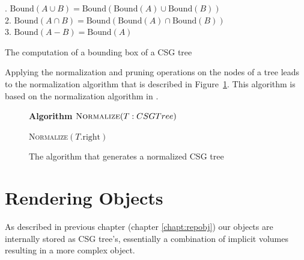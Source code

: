 \documentclass[a4paper,10pt,twocolumn]{article}
\newcommand{\Bound}{\mbox{Bound}}
\begin{document}
    \begin{table}[h]
        {\fontsize{8.7}{10}. $\Bound(A \cup B) = \Bound(\Bound(A) \cup \Bound(B))$\\
            2. $\Bound(A \cap B) = \Bound(\Bound(A) \cap \Bound(B))$\\
            3. $\Bound(A - B)    = \Bound(A)$\\
        }
        \caption{The computation of a bounding box of a CSG tree}
        \label{table:bounding_box}
    \end{table}

    Applying the normalization and pruning operations on the nodes of a tree leads to the normalization algorithm that is described in  Figure~\ref{figure:algorithm}. This algorithm is based on the normalization algorithm in \cite{Wiegand96}.

    \begin{figure}[ht]
            \textbf{Algorithm} $\textsc{Normalize}(T: CSGTree)$\\
            \noindent
            \begin{algorithm}[H]
                \BlankLine
                \BlankLine
                \textsc{Normalize}$(T\mbox{.right})$\;
            \end{algorithm}
        \caption{The algorithm that generates a normalized CSG tree}
        \label{figure:algorithm}
    \end{figure}

\section{Rendering Objects}

As described in previous chapter (chapter \ref{chapt:repobj}) our objects are internally stored as CSG tree's, essentially a combination of implicit volumes resulting in a more complex object.
\end{document}
